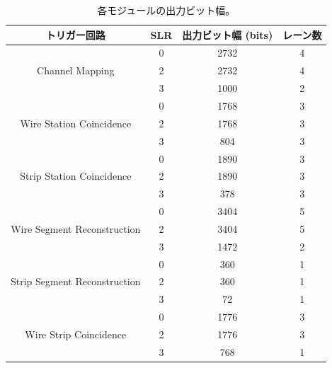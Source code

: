 \begin{table}[]
    \centering
    \caption[各モジュールの出力ビット幅]{各モジュールの出力ビット幅。}
    \label{tab:output_width}    
    \begin{tabular}{|c|c|c|c|}
    \hline
    トリガー回路                                      & SLR & 出力ビット幅 (bits) & レーン数 \\ \hline\hline
    \multirow{3}{*}{Channel Mapping}               & 0   & 2732          & 4    \\ \cline{2-4} 
                                                  & 2   & 2732          & 4    \\ \cline{2-4} 
                                                  & 3   & 1000          & 2    \\ \hline
    \multirow{3}{*}{Wire Station Coincidence}     & 0   & 1768          & 3    \\ \cline{2-4} 
                                                  & 2   & 1768          & 3    \\ \cline{2-4} 
                                                  & 3   & 804           & 3    \\ \hline
    \multirow{3}{*}{Strip Station Coincidence}    & 0   & 1890          & 3    \\ \cline{2-4} 
                                                  & 2   & 1890          & 3    \\ \cline{2-4} 
                                                  & 3   & 378           & 3    \\ \hline
    \multirow{3}{*}{Wire Segment Reconstruction}  & 0   & 3404          & 5    \\ \cline{2-4} 
                                                  & 2   & 3404          & 5    \\ \cline{2-4} 
                                                  & 3   & 1472          & 2    \\ \hline
    \multirow{3}{*}{Strip Segment Reconstruction} & 0   & 360           & 1    \\ \cline{2-4} 
                                                  & 2   & 360           & 1    \\ \cline{2-4} 
                                                  & 3   & 72            & 1    \\ \hline
    \multirow{3}{*}{Wire Strip Coincidence}       & 0   & 1776          & 3    \\ \cline{2-4} 
                                                  & 2   & 1776          & 3    \\ \cline{2-4} 
                                                  & 3   & 768           & 1    \\ \hline
    \end{tabular}
\end{table}

